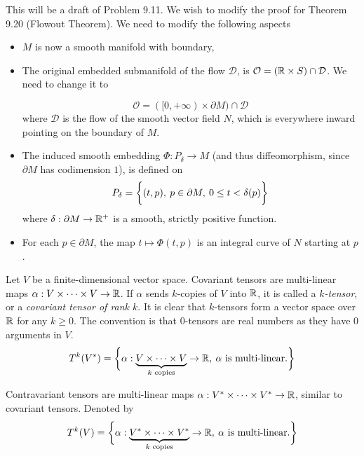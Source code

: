 \documentclass[../main-manifolds.tex]{subfiles}
\begin{document}
This will be a draft of Problem 9.11. We wish to modify the proof for Theorem 9.20 (Flowout Theorem). We need to modify the following aspects
\begin{itemize}
    \item $M$ is now a smooth manifold with boundary,
    \item The original embedded submanifold of the flow $\mathcal{D}$, is $\mathcal{O} = (\mathbb{R}\times S)\cap \mathcal{D}$. We need to change it to

    \[
        \mathcal{O} = ([0,+\infty)\times \partial M)\cap \mathcal{D}
    \]
    where $\mathcal{D}$ is the flow of the smooth vector field $N$, which is everywhere inward pointing on the boundary of $M$.
    \item The induced smooth embedding $\Phi: P_\delta\to M$ (and thus diffeomorphism, since $\partial M$ has codimension $1$), is defined on 
    \[
        P_\delta = \biggl\{{(t,p),\: p\in\partial M,\: 0\leq t< \delta(p)}\biggr\}
    \]
    where $\delta:\partial M\to \mathbb{R}^+$ is a smooth, strictly positive function.
    \item For each $p\in \partial M$, the map $t\mapsto \Phi(t,p)$ is an integral curve of $N$ starting at $p$. 
\end{itemize}





\begin{definition}
    Let $V$ be a finite-dimensional vector space. Covariant tensors are multi-linear maps $\alpha: V\times \cdots \times V\to \mathbb{R}$. If $\alpha$ sends $k$-copies of $V$ into $\mathbb{R}$, it is called a \emph{$k$-tensor}, or a \emph{covariant tensor of rank $k$}. It is clear that $k$-tensors form a vector space over $\mathbb{R}$ for any $k\geq 0$. The convention is that $0$-tensors are real numbers as they have $0$ arguments in $V$. 
    \[
        T^{k}(V^*) = \biggl\{{\alpha: \underbrace{V\times\cdots\times V}_{k\text{ copies}}\to\mathbb{R},\: \alpha\text{ is multi-linear.}}\biggr\}
    \]
\end{definition}

\begin{definition}
    Contravariant tensors are multi-linear maps $\alpha: V^*\times \cdots\times V^*\to \mathbb{R}$, similar to covariant tensors. Denoted by
    \[
        T^{k}(V) = \biggl\{{\alpha: \underbrace{V^*\times\cdots\times V^*}_{k\text{ copies}}\to\mathbb{R},\: \alpha\text{ is multi-linear.}}\biggr\}
    \]
\end{definition}
\end{document}
